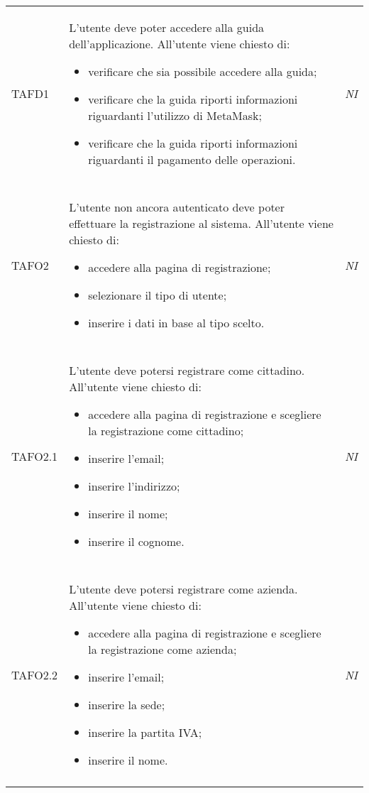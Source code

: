 \begin{longtable}{ >{\centering}p{} >{}p{}
			>{\centering}p{}}
\hypertarget{TAFD1}{TAFD1} & L'utente deve poter accedere alla guida dell'applicazione. All'utente viene
		 chiesto di:
		 \begin{itemize}
		 	\item verificare che sia possibile accedere alla guida;
		 	\item verificare che la guida riporti informazioni riguardanti l'utilizzo di
		 	MetaMask\glo{};
		 	\item verificare che la guida riporti informazioni riguardanti il pagamento
		 	delle operazioni. 
		 \end{itemize} & \textit{NI}\\ \tabularnewline
\hypertarget{TAFO2}{TAFO2} & L'utente non ancora autenticato deve poter effettuare la registrazione al
		 sistema. All'utente viene chiesto di:
		 \begin{itemize}
		 	\item accedere alla pagina di registrazione;
		 	\item selezionare il tipo di utente;
		 	\item inserire i dati in base al tipo scelto.
		 \end{itemize} & \textit{NI}\\ \tabularnewline
\hypertarget{TAFO2.1}{TAFO2.1} & L'utente deve potersi registrare come cittadino. All'utente viene chiesto di:
		 \begin{itemize}
		 	\item accedere alla pagina di registrazione e scegliere la registrazione
		 	come cittadino;
		 	\item inserire l'email;
		 	\item inserire l'indirizzo;
		 	\item inserire il nome;
		 	\item inserire il cognome.
		 \end{itemize} & \textit{NI}\\ \tabularnewline
\hypertarget{TAFO2.2}{TAFO2.2} & L'utente deve potersi registrare come azienda. All'utente viene chiesto di:
		 \begin{itemize}
		 	\item accedere alla pagina di registrazione e scegliere la registrazione
		 	come azienda;
		 	\item inserire l'email;
		 	\item inserire la sede;
		 	\item inserire la partita IVA;
		 	\item inserire il nome.
		 \end{itemize} & \textit{NI}\\ \tabularnewline

\end{longtable}
